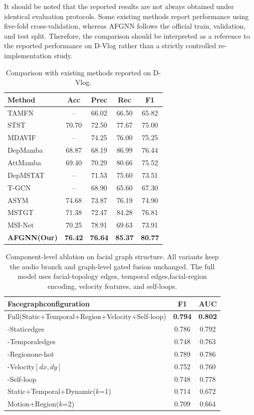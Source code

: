 \documentclass[conference]{IEEEtran}
\begin{document}
It should be noted that the reported results are not always obtained under identical evaluation protocols. Some existing methods report performance using five-fold cross-validation, whereas AFGNN follows the official train, validation, and test split. Therefore, the comparison should be interpreted as a reference to the reported performance on D-Vlog rather than a strictly controlled re-implementation study.
\begin{table}[t]
\centering
\caption{Comparison with existing methods reported on D-Vlog.}
\label{tab:sota}
\footnotesize
\setlength{\tabcolsep}{3pt}%
\begin{tabular}{lcccc}
\toprule[1.2pt]
Method&Acc&Prec&Rec&F1\\
\midrule[0.8pt]
TAMFN~\cite{model:TAMFN}&--&66.02&66.50&65.82\\
STST\cite{model:STST} & 70.70 & 72.50 & 77.67 & 75.00 \\
MDAVIF\cite{model:MDAVIF} & -- & 74.25 & 76.00 & 75.25 \\
DepMamba\cite{model:DepMamba} & 68.87 & 68.19 & 86.99 & 76.44 \\
AttMamba\cite{model:AttMamba} & 69.40 & 70.29 & 80.66 & 75.52 \\
DepMSTAT~\cite{tao2024depmstat}&--&71.53&75.60&73.51\\
T-GCN~\cite{model:TGCN}&--&68.90&65.60&67.30\\
ASYM~\cite{model:ASYM}&74.68&73.87&76.19&74.90\\
MSTGT~\cite{model:MSTGT}&71.38&72.47&84.28&76.81\\
MSI-Net~\cite{model:MSI-Net}&70.25&78.91&69.63&73.91\\
\midrule[0.8pt]
\textbf{AFGNN(Our)}&\textbf{76.42}&\textbf{76.64}&\textbf{85.37}&\textbf{80.77}\\
\bottomrule[1.2pt]
\end{tabular}
\end{table}


\begin{table}[t]
\centering
\caption{Component-level ablation on facial graph structure. All variants keep the audio branch and graph-level gated fusion unchanged. The
full model uses facial-topology edges, temporal edges,facial-region encoding, velocity features, and self-loops.}
\label{tab:graph_ablation}
\small
\begin{tabular}{lcc}
\toprule[1.2pt]
Facegraphconfiguration&F1&AUC\\
\midrule[0.8pt]
Full(Static+Temporal+Region+Velocity+Self-loop)&\textbf{0.794}&\textbf{0.802}\\
\midrule[0.8pt]
-Staticedges&0.786&0.792\\
-Temporaledges&0.748&0.763\\
-Regionone-hot&0.789&0.786\\
-Velocity$[dx,dy]$&0.752&0.760\\
-Self-loop&0.748&0.778\\
\midrule[0.8pt]
Static+Temporal+Dynamic($k$=1)&0.714&0.672\\
Motion+Region($k$=2)&0.709&0.664\\
\bottomrule[1.2pt]
\end{tabular}
\end{table}
\end{document}
